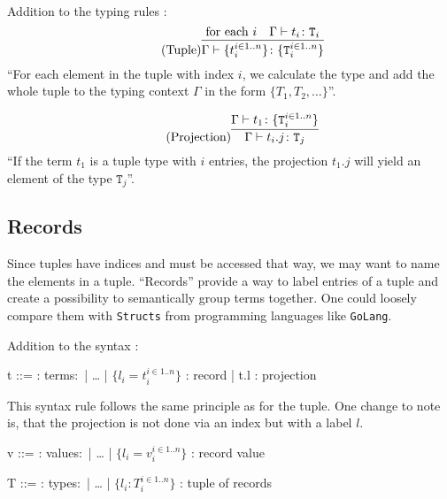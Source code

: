 ~\\
Addition to the typing rules \cite{pierce2002ProgLang}:
\begin{equation*}
    \tag{Tuple}
    \infer{
    \Gamma \vdash \{t_i^{i \in 1..n}\} \colon \{\texttt{T}_i^{i \in 1..n}\}
    }{
    \text{for each } i & \Gamma \vdash t_i \colon \texttt{T}_i
    }
\end{equation*}
``For each element in the tuple with index $i$, we calculate the type
and add the whole tuple to the typing context $\Gamma$ in the form $\{T_1, T_2, \dots\}$''.

\begin{equation*}
    \tag{Projection}
    \infer{
    \Gamma \vdash t_i . j \colon \texttt{T}_j
    }{
    \Gamma \vdash t_1 \colon \{\texttt{T}_i^{i \in 1..n}\}
    }
\end{equation*}
``If the term $t_1$ is a tuple type with $i$ entries, the projection
$t_1 . j$ will yield an element of the type $\texttt{T}_j$''.

\subsection{Records}

Since tuples have indices and must be accessed that way, we may want to
name the elements in a tuple. ``Records'' provide a way to label entries
of a tuple and create a possibility to semantically group terms together.
One could loosely compare them with \texttt{Structs} from programming
languages like \texttt{GoLang}.

Addition to the syntax \cite{pierce2002ProgLang}:
\begin{bnfgrammar}
    t ::= : terms$\colon$
    | \dots
    | $\{l_i = t_i^{i \in 1..n}\}$ : record
    | t.l : projection
\end{bnfgrammar}\leavevmode\newline
This syntax rule follows the same principle as for the tuple. One change to
note is, that the projection is not done via an index but with a label $l$.

\begin{bnfgrammar}
    v ::= : values$\colon$
    | \dots
    | $\{l_i = v_i^{i \in 1..n}\}$ : record value
\end{bnfgrammar}\leavevmode\newline

\begin{bnfgrammar}
    T ::= : types$\colon$
    | \dots
    | $\{l_i \colon T_i^{i \in 1..n}\}$ : tuple of records
\end{bnfgrammar}\leavevmode\newline


